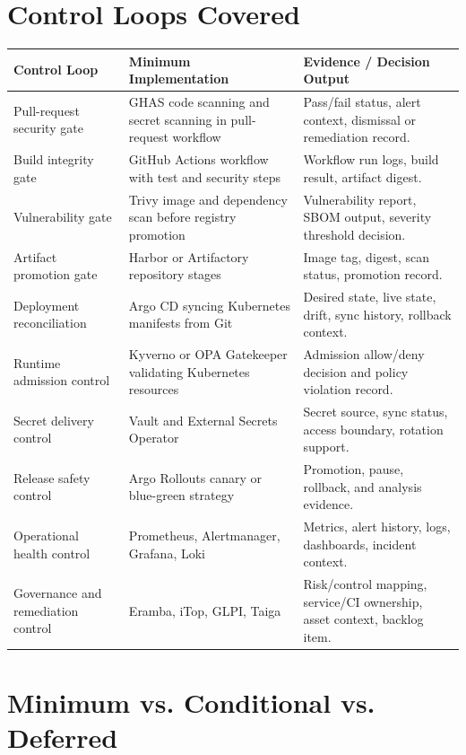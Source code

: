 \documentclass[10pt,letterpaper]{article}
\begin{document}
\section{Control Loops Covered}

\begin{tabularx}{\textwidth}{L{3.1cm} Y Y}
\toprule
\textbf{Control Loop} & \textbf{Minimum Implementation} & \textbf{Evidence / Decision Output} \\
\midrule
Pull-request security gate & GHAS code scanning and secret scanning in pull-request workflow & Pass/fail status, alert context, dismissal or remediation record. \\
Build integrity gate & GitHub Actions workflow with test and security steps & Workflow run logs, build result, artifact digest. \\
Vulnerability gate & Trivy image and dependency scan before registry promotion & Vulnerability report, SBOM output, severity threshold decision. \\
Artifact promotion gate & Harbor or Artifactory repository stages & Image tag, digest, scan status, promotion record. \\
Deployment reconciliation & Argo CD syncing Kubernetes manifests from Git & Desired state, live state, drift, sync history, rollback context. \\
Runtime admission control & Kyverno or OPA Gatekeeper validating Kubernetes resources & Admission allow/deny decision and policy violation record. \\
Secret delivery control & Vault and External Secrets Operator & Secret source, sync status, access boundary, rotation support. \\
Release safety control & Argo Rollouts canary or blue-green strategy & Promotion, pause, rollback, and analysis evidence. \\
Operational health control & Prometheus, Alertmanager, Grafana, Loki & Metrics, alert history, logs, dashboards, incident context. \\
Governance and remediation control & Eramba, iTop, GLPI, Taiga & Risk/control mapping, service/CI ownership, asset context, backlog item. \\
\bottomrule
\end{tabularx}

\section{Minimum vs. Conditional vs. Deferred}
\end{document}

